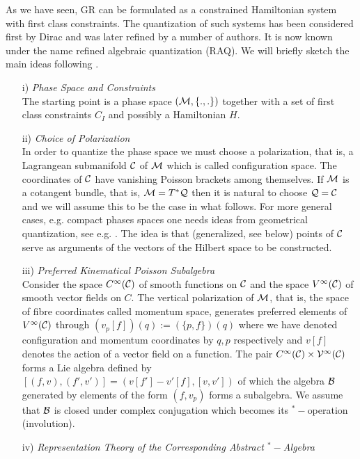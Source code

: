\documentclass[12pt]{report}
\begin{document}
As we have seen, GR can be formulated as a constrained Hamiltonian system 
with first class constraints. The quantization of such systems has been
considered first by Dirac \cite{17} and was later refined by a number of 
authors.
It is now known under the name refined algebraic quantization (RAQ).
We will briefly sketch the main ideas following \cite{25}.
%
\begin{itemize}
%
\item[i)] {\it Phase Space and Constraints}\\
The starting point is a phase space $({\cal M},\{.,.\})$ together with a set
of first class constraints $C_I$ and possibly a Hamiltonian $H$.
%
\item[ii)] {\it Choice of Polarization}\\
In order to quantize the phase space we must choose a polarization, that is,
a Lagrangean submanifold $\cal C$ of $\cal M$ which is called configuration 
space. The coordinates of $\cal C$ have vanishing Poisson brackets among 
themselves. If $\cal M$ is a cotangent bundle, that is, 
${\cal M}=T^\ast {\cal Q}$ then it is natural to choose ${\cal Q}={\cal C}$
and we will assume this to be the case in what follows. For more general
cases, e.g. compact phases spaces one needs ideas from geometrical 
quantization, see e.g. \cite{26}.
The idea is that (generalized, see below) points of $\cal C$ serve as 
arguments of the vectors of the Hilbert space to be constructed.
%
\item[iii)] {\it Preferred Kinematical Poisson Subalgebra}\\
Consider the space $C^\infty({\cal C})$ of smooth functions on $\cal C$
and the space $V^\infty({\cal C})$ of smooth vector fields on $C$.
The vertical polarization of $\cal M$, that is, the space of fibre 
coordinates called momentum space, generates preferred elements of 
$V^\infty({\cal C})$ through $(v_p[f])(q):=(\{p,f\})(q)$ where we have 
denoted configuration and momentum coordinates by $q,p$ respectively
and $v[f]$ denotes the action of a vector field on a function. 
The pair $C^\infty(\cal C)\times V^\infty({\cal C})$ forms a Lie algebra
defined by $[(f,v),(f',v')]=(v[f']-v'[f],[v,v'])$ of which the algebra 
$\cal B$ generated by elements of the form $(f,v_p)$ forms a subalgebra.
We assume that $\cal B$ is closed under complex conjugation which becomes 
its $^\ast-$operation (involution).
%
\item[iv)] {\it Representation Theory of the Corresponding Abstract
$^\ast-$Algebra}\\

\end{itemize}
\end{document}
